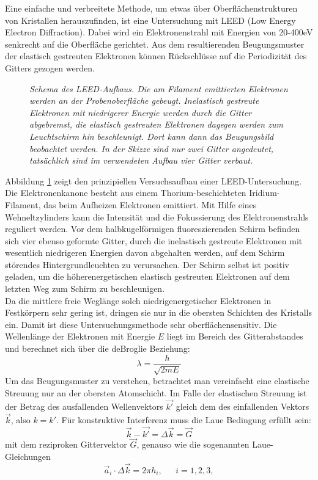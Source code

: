 \FloatBarrier

Eine einfache und verbreitete Methode, um etwas über Oberflächenstrukturen von
 Kristallen herauszufinden, ist eine Untersuchung mit LEED (Low Energy Electron
 Diffraction).
 Dabei wird ein Elektronenstrahl mit Energien von 20-400eV senkrecht auf die
 Oberfläche gerichtet. Aus dem resultierenden
 Beugungsmuster der elastisch gestreuten Elektronen können Rückschlüsse auf die Periodizität des Gitters
 gezogen werden.


 \begin{figure}[H]
	\centering
	\sffamily 
	
	\caption{\textit{Schema des LEED-Aufbaus. Die am Filament emittierten Elektronen werden an der
	Probenoberfläche gebeugt. Inelastisch gestreute Elektronen mit niedrigerer Energie werden durch die
	Gitter abgebremst, die elastisch gestreuten Elektronen dagegen werden zum Leuchtschirm
	hin beschleunigt. Dort kann dann das Beugungsbild beobachtet werden. In der Skizze sind nur zwei
	Gitter angedeutet, tatsächlich sind im verwendeten Aufbau vier Gitter verbaut.}}
	\label{leedaufbau}
\end{figure}




 Abbildung \ref{leedaufbau} zeigt den prinzipiellen Versuchsaufbau einer LEED-Untersuchung. Die
 Elektronenkanone besteht aus einem Thorium-beschichteten Iridium-Filament, das beim Aufheizen
 Elektronen emittiert. Mit Hilfe eines Wehneltzylinders kann die Intensität und die Fokussierung
 des Elektronenstrahls reguliert werden. Vor dem halbkugelförmigen fluoreszierenden Schirm befinden
 sich vier ebenso geformte Gitter, durch die inelastisch gestreute Elektronen mit wesentlich
 niedrigeren Energien davon abgehalten werden, auf dem Schirm störendes Hintergrundleuchten zu
 verursachen. Der Schirm selbst ist positiv geladen, um die höherenergetischen elastisch gestreuten
 Elektronen auf dem letzten Weg zum Schirm zu beschleunigen.\\
  Da die mittlere freie Weglänge solch niedrigenergetischer Elektronen in
 Festkörpern sehr gering ist, dringen sie nur in die obersten Schichten des
 Kristalls ein. Damit ist diese Untersuchungsmethode sehr oberflächensensitiv.
 Die Wellenlänge der Elektronen mit Energie $E$ liegt im Bereich des Gitterabstandes und
 berechnet sich über die deBroglie Beziehung:
 \[\lambda=\frac{h}{\sqrt{2mE}}\]%
Um das Beugungsmuster zu verstehen, betrachtet man vereinfacht eine elastische
Streuung nur an der obersten Atomschicht. Im Falle der elastischen Streuung ist
der Betrag des ausfallenden Wellenvektors $\vec{k'}$ gleich dem des
einfallenden Vektors $\vec{k}$, also $k=k'$. Für konstruktive Interferenz
muss die Laue Bedingung erfüllt sein:
\[\vec{k}-\vec{k'}=\Delta \vec{k}=\vec{G}\]
mit dem reziproken Gittervektor $\vec{G}$, genauso wie die sogenannten Laue-Gleichungen
\[\vec{a}_i\cdot \Delta \vec{k}=2\pi h_i,~~~~~~~i=1, 2, 3,\]

